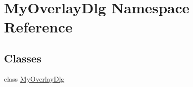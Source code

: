 \hypertarget{namespace_my_overlay_dlg}{\section{My\-Overlay\-Dlg Namespace Reference}
\label{namespace_my_overlay_dlg}
}
\subsection*{Classes}
\begin{DoxyCompactItemize}
\item 
class \hyperlink{class_my_overlay_dlg_1_1_my_overlay_dlg}{My\-Overlay\-Dlg}
\end{DoxyCompactItemize}
